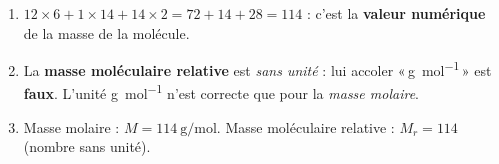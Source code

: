 \documentclass[11pt,a4paper]{article}
\begin{document}
\begin{corrige}
\begin{enumerate}[label=\alph*)]
  \item $12\times6+1\times14+14\times2=72+14+28=114$ : c'est la \textbf{valeur numérique} de la masse de la molécule.
  \item La \textbf{masse moléculaire relative} est \emph{sans unité} : lui accoler «\,\si{\gram\per\mole}\,» est \textbf{faux}. L'unité \si{\gram\per\mole} n'est correcte que pour la \emph{masse molaire}.
  \item Masse molaire : $M=\qty{114}{\gram\per\mole}$. \quad Masse moléculaire relative : $M_r=114$ (nombre sans unité).
\end{enumerate}
\end{corrige}
\end{document}
